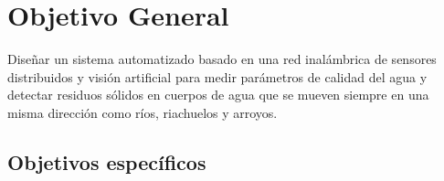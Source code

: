 \section{Objetivo General}
\label{sec:objetivos}
Diseñar un sistema automatizado basado en una red inalámbrica de sensores distribuidos y visión artificial para medir parámetros de calidad del agua y detectar residuos sólidos en cuerpos de agua que se mueven siempre en una misma dirección como ríos, riachuelos y arroyos. 


\subsection{Objetivos específicos}
